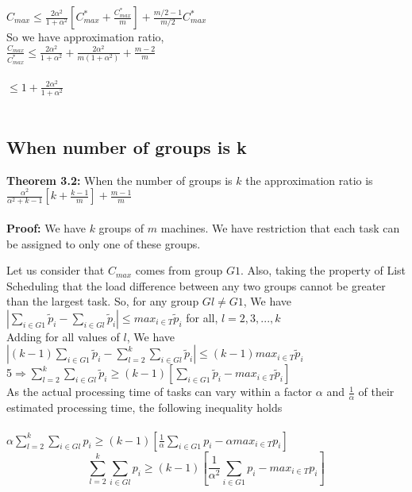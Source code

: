 \documentclass[10pt, conference, compsocconf]{IEEEtran}
\begin{document}
 $C_{max} \leq \frac{2\alpha^{2}}{1+ \alpha^{2}}[C_{max}^{*}+ \frac{C_{max}^{*}}{m}] + {\frac{m/2-1}{m/2}} C_{max}^{*} $\\
 
 So we have approximation ratio,\\
 $\frac{C_{max}}{C_{max}^{*}} \leq \frac{2\alpha^{2}}{1+\alpha^{2}} + \frac{2\alpha^{2}}{m{(1+\alpha^{2})}}  + \frac{m-2}{m}$\\
 \\
$ \leq 1 + \frac{2\alpha^{2}}{1+\alpha^{2}} $\\
\\
\subsection{When number of groups is k}
\textbf{Theorem 3.2:} When the number of groups is $k$ the approximation ratio is $ \frac{\alpha^{2}}{\alpha^{2}+k-1}[k+ {\frac{k-1}{m}} ]+ {\frac{m-1}{m}}    $ \\
\\
\textbf{Proof:} 
  We have $k$ groups of $m$ machines. We have restriction that each task can be assigned to only one of these groups. 

Let us consider  that $ C_{max}$ comes from group  $G1$. Also, taking the property of List Scheduling that the load difference between any two groups cannot be greater than the largest task. So, for any group $Gl \neq G1$, We have\\

$|\sum_{i \in G1 }^{}{\tilde p_{i}}- \sum_{i \in Gl }^{}{\tilde p_{i}}| \leq {max_{i \in T}}{\tilde p_{i}}$  \hspace*{15pt}   for all, $l = 2,3,...,k$ \\

Adding for all values of $l$, We have \\

$|(k-1)\sum_{i \in G1 }^{}{\tilde p_{i}}- \sum_{l=2}^{k}\sum_{i \in Gl }^{}{\tilde p_{i}}| \leq (k-1) {max_{i \in T}}{\tilde p_{i}}$  \hspace*{15pt}   \\

5$\Rightarrow \sum_{l=2}^{k}\sum_{i \in Gl }^{}{\tilde p_{i}} \geq (k-1)[\sum_{i \in G1 }^{}{\tilde p_{i}}- {max_{i \in T}}{\tilde p_{i}}]$\\



As the actual processing time of tasks  can vary within a factor $\alpha$ and $\frac{1}{\alpha}$ of their estimated processing time, the following inequality holds\\
\\
\hspace*{90pt}$ \alpha\sum_{l=2}^{k}\sum_{i \in Gl }^{}{{p_{i}}} \geq (k-1)[\frac{1}{\alpha}\sum_{i \in G1 }^{}{{p_{i}}}- \alpha {max_{i \in T}}{{p_{i}}}]$\\
\begin{equation}
\sum_{l=2}^{k}\sum_{i \in Gl }^{}{{p_{i}}} \geq (k-1)[\frac{1}{\alpha^{2}}\sum_{i \in G1 }^{}{{p_{i}}}-  {max_{i \in T}}{{p_{i}}}]
\end{equation}
\end{document}
